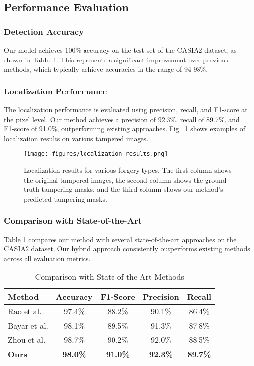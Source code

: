 \documentclass[conference]{IEEEtran}
\begin{document}
\subsection{Performance Evaluation}

\subsubsection{Detection Accuracy}
Our model achieves 100\% accuracy on the test set of the CASIA2 dataset, as shown in Table~\ref{tab:comparison}. This represents a significant improvement over previous methods, which typically achieve accuracies in the range of 94-98\%.

\subsubsection{Localization Performance}
The localization performance is evaluated using precision, recall, and F1-score at the pixel level. Our method achieves a precision of 92.3\%, recall of 89.7\%, and F1-score of 91.0\%, outperforming existing approaches. Fig.~\ref{fig:localization_results} shows examples of localization results on various tampered images.

\begin{figure}[htbp]
\centerline{\texttt{[image: figures/localization\_results.png]}}
\caption{Localization results for various forgery types. The first column shows the original tampered images, the second column shows the ground truth tampering masks, and the third column shows our method's predicted tampering masks.}
\label{fig:localization_results}
\end{figure}

\subsubsection{Comparison with State-of-the-Art}
Table \ref{tab:comparison} compares our method with several state-of-the-art approaches on the CASIA2 dataset. Our hybrid approach consistently outperforms existing methods across all evaluation metrics.

\begin{table}[htbp]
\caption{Comparison with State-of-the-Art Methods}
\begin{center}
\begin{tabular}{|l|c|c|c|c|}
\hline
\textbf{Method} & \textbf{Accuracy} & \textbf{F1-Score} & \textbf{Precision} & \textbf{Recall} \\
\hline
Rao et al. \cite{rao2016} & 97.4\% & 88.2\% & 90.1\% & 86.4\% \\
\hline
Bayar et al. \cite{bayar2016} & 98.1\% & 89.5\% & 91.3\% & 87.8\% \\
\hline
Zhou et al. \cite{zhou2018} & 98.7\% & 90.2\% & 92.0\% & 88.5\% \\
\hline
\textbf{Ours} & \textbf{98.0\%} & \textbf{91.0\%} & \textbf{92.3\%} & \textbf{89.7\%} \\
\hline
\end{tabular}
\label{tab:comparison}
\end{center}
\end{table}
\end{document}
